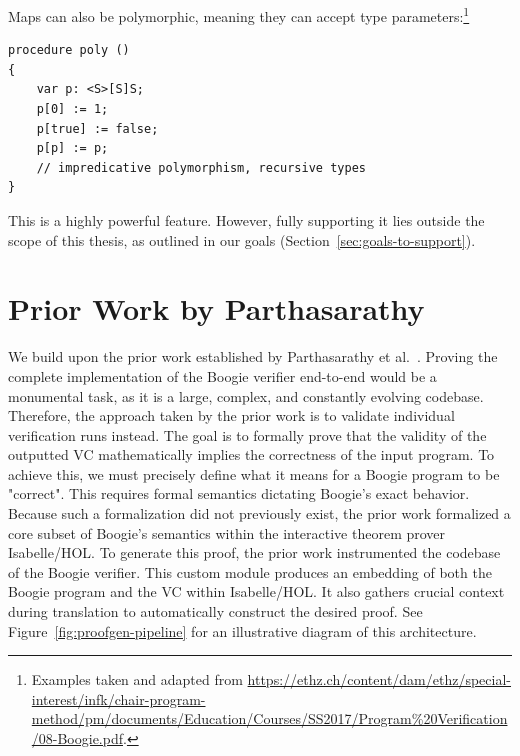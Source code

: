 Maps can also be polymorphic, meaning they can accept type parameters:\footnote{Examples taken and adapted from \url{https://ethz.ch/content/dam/ethz/special-interest/infk/chair-program-method/pm/documents/Education/Courses/SS2017/Program\%20Verification/08-Boogie.pdf}.}
\begin{lstlisting}[caption={Polymorphic Boogie Map Example}]
procedure poly ()
{
    var p: <S>[S]S;
    p[0] := 1;
    p[true] := false;
    p[p] := p; 
    // impredicative polymorphism, recursive types
}
\end{lstlisting}



This is a highly powerful feature. However, fully supporting it lies outside the scope of this thesis, as outlined in our goals (Section~\ref{sec:goals-to-support}).


\section{Prior Work by Parthasarathy}
\label{sec:prior-work}

We build upon the prior work established by Parthasarathy et al.~\cite{parthasarathy2021formally}.
Proving the complete implementation of the Boogie verifier end-to-end would be a monumental task,
as it is a large, complex, and constantly evolving codebase.
Therefore, the approach taken by the prior work is to validate individual verification runs instead.
The goal is to formally prove that the validity of the outputted VC
mathematically implies the correctness of the input program.
To achieve this, we must precisely define what it means for a Boogie program to be "correct".
This requires formal semantics dictating Boogie's exact behavior.
Because such a formalization did not previously exist,
the prior work formalized a core subset of Boogie's semantics within the interactive theorem prover Isabelle/HOL.
To generate this proof, the prior work instrumented the codebase of the Boogie verifier.
This custom module produces an embedding of both the Boogie program and the VC within Isabelle/HOL.
It also gathers crucial context during translation to automatically construct the desired proof.
See Figure~\ref{fig:proofgen-pipeline} for an illustrative diagram of this architecture.

